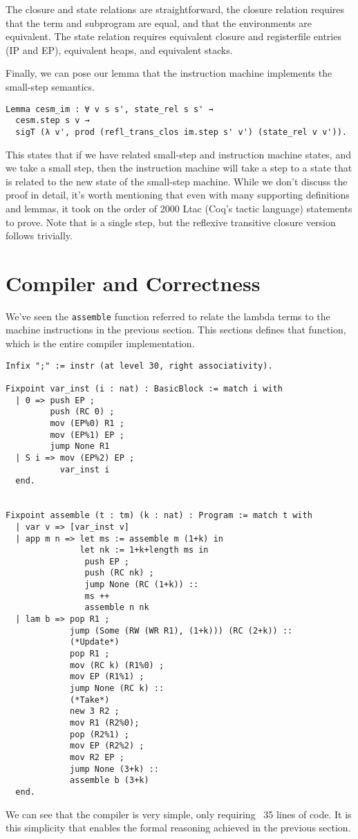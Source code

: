 The closure and state relations are straightforward, the closure relation
requires that the term and subprogram are equal, and that the environments are
equivalent. The state relation requires equivalent closure and registerfile
entries (IP and EP), equivalent heaps, and equivalent stacks.

Finally, we can pose our lemma that the instruction machine implements the
small-step semantics.

\begin{verbatim}
Lemma cesm_im : ∀ v s s', state_rel s s' → 
  cesm.step s v → 
  sigT (λ v', prod (refl_trans_clos im.step s' v') (state_rel v v')).
\end{verbatim}
This states that if we have related small-step and instruction machine states,
and we take a small step, then the instruction machine will take a step to a
state that is related to the new state of the small-step machine.  While we
don't discuss the proof in detail, it's worth mentioning that even with many
supporting definitions and lemmas, it took on the order of 2000 Ltac (Coq's
tactic language) statements to prove. Note that is a single step, but the
reflexive transitive closure version follows trivially. 

\section{Compiler and Correctness}

We've seen the \texttt{assemble} function referred to relate the lambda terms to
the machine instructions in the previous section. This sections defines that
function, which is the entire compiler implementation.

\begin{verbatim}
Infix ";" := instr (at level 30, right associativity).

Fixpoint var_inst (i : nat) : BasicBlock := match i with
  | 0 => push EP ;
         push (RC 0) ;
         mov (EP%0) R1 ;
         mov (EP%1) EP ;
         jump None R1
  | S i => mov (EP%2) EP ; 
           var_inst i
  end.


Fixpoint assemble (t : tm) (k : nat) : Program := match t with  
  | var v => [var_inst v]
  | app m n => let ms := assemble m (1+k) in
               let nk := 1+k+length ms in
                push EP ;
                push (RC nk) ;
                jump None (RC (1+k)) :: 
                ms ++ 
                assemble n nk
  | lam b => pop R1 ;
             jump (Some (RW (WR R1), (1+k))) (RC (2+k)) ::
             (*Update*)
             pop R1 ;  
             mov (RC k) (R1%0) ;
             mov EP (R1%1) ;
             jump None (RC k) ::
             (*Take*)
             new 3 R2 ;
             mov R1 (R2%0);
             pop (R2%1) ;
             mov EP (R2%2) ;
             mov R2 EP ;
             jump None (3+k) :: 
             assemble b (3+k)
  end. 
\end{verbatim}
We can see that the compiler is very simple, only requiring ~35 lines of code.
It is this simplicity that enables the formal reasoning achieved in the previous
section. 

